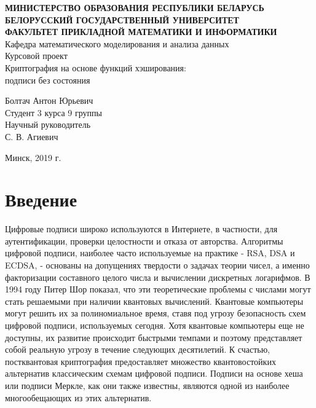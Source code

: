 \documentclass[a4paper, 14pt]{extarticle}
\begin{document}

\begin{center}
    \normalsize{\textbf{МИНИСТЕРСТВО ОБРАЗОВАНИЯ РЕСПУБЛИКИ БЕЛАРУСЬ}}\\
    \hfill \break
    \normalsize{\textbf{БЕЛОРУССКИЙ ГОСУДАРСТВЕННЫЙ УНИВЕРСИТЕТ}}\\
    \hfill \break
    \small{\textbf{ФАКУЛЬТЕТ ПРИКЛАДНОЙ МАТЕМАТИКИ И ИНФОРМАТИКИ}}\\
    \hfill \break
    \large{Кафедра математического моделирования и анализа данных}\\
    \vspace{40mm}
    \normalsize{Курсовой проект}\\
    \hfill \break
    \normalsize{Криптография на основе функций хэширования:\\ подписи без состояния}\\
    \hfill \break
\end{center}

\begin{flushright}
    \vspace{20mm}
    Болтач Антон Юрьевич\\
    Студент 3 курса 9 группы\\
    Научный руководитель\\
    С. В. Агиевич\\
\end{flushright}

\vfill
\begin{center}
    Минск, 2019 г.
\end{center}
\thispagestyle{empty} %
    

\newpage

\tableofcontents
\newpage

\section{Введение}
Цифровые подписи широко используются в Интернете, в частности, для аутентификации, проверки целостности и отказа от авторства. Алгоритмы цифровой подписи, наиболее часто используемые на практике - RSA, DSA и ECDSA, - основаны на допущениях твердости о задачах теории чисел, а именно факторизации составного целого числа и вычислении дискретных логарифмов. В 1994 году Питер Шор показал, что эти теоретические проблемы с числами могут стать решаемыми при наличии квантовых вычислений. Квантовые компьютеры могут решить их за полиномиальное время, ставя под угрозу безопасность схем цифровой подписи, используемых сегодня. Хотя квантовые компьютеры еще не доступны, их развитие происходит быстрыми темпами и поэтому представляет собой реальную угрозу в течение следующих десятилетий. К счастью, постквантовая криптография предоставляет множество квантовостойких альтернатив классическим схемам цифровой подписи. Подписи на основе хеша или подписи Меркле, как они также известны, являются одной из наиболее многообещающих из этих альтернатив.
\end{document}
